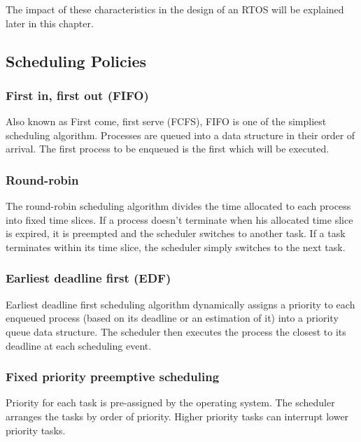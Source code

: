 The impact of these characteristics in the design of an RTOS will be explained later in this chapter.

\subsection{Scheduling Policies}

\subsubsection{First in, first out (FIFO)}
Also known as First come, first serve (FCFS), FIFO is one of the simpliest scheduling algorithm.
Processes are queued into a data structure in their order of arrival.
The first process to be enqueued is the first which will be executed.

\subsubsection{Round-robin}
The round-robin scheduling algorithm divides the time allocated to each process into fixed time slices.
If a process doesn't terminate when his allocated time slice is expired, it is preempted and the scheduler switches to another task.
If a task terminates within its time slice, the scheduler simply switches to the next task.

\subsubsection{Earliest deadline first (EDF)}
Earliest deadline first scheduling algorithm dynamically assigns a priority
    to each enqueued process (based on its deadline or an estimation of it) into a priority queue data structure.
The scheduler then executes the process the closest to its deadline at each scheduling event.

\subsubsection{Fixed priority preemptive scheduling}
Priority for each task is pre-assigned by the operating system.
The scheduler arranges the tasks by order of priority.
Higher priority tasks can interrupt lower priority tasks.

